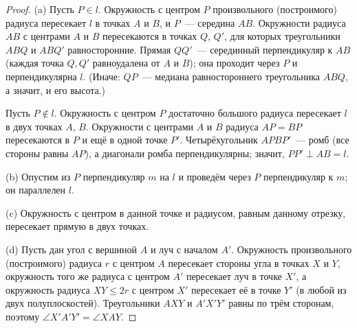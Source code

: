 \begin{proof}
(a) Пусть $P\in l$. Окружность с центром $P$ произвольного (построимого) радиуса пересекает $l$ в точках $A$ и $B$, и
$P$~--- середина $AB$. Окружности радиуса $AB$ с центрами $A$ и $B$ пересекаются в точках $Q$, $Q'$, для которых
треугольники $ABQ$ и $ABQ'$ равносторонние. Прямая $QQ'$~--- серединный перпендикуляр к $AB$ (каждая точка $Q,Q'$
равноудалена от $A$ и $B$); она проходит через $P$ и перпендикулярна $l$. (Иначе: $QP$~--- медиана равностороннего
треугольника $ABQ$, а значит, и его высота.)

Пусть $P\notin l$. Окружность с центром $P$ достаточно большого радиуса пересекает $l$ в двух точках $A$, $B$. Окружности с
центрами $A$ и $B$ радиуса $AP=BP$ пересекаются в $P$ и ещё в одной точке $P'$. Четырёхугольник $APBP'$~--- ромб (все
стороны равны $AP$), а диагонали ромба перпендикулярны; значит, $PP'\perp AB=l$.

(b) Опустим из $P$ перпендикуляр $m$ на $l$ и проведём через $P$ перпендикуляр к $m$; он параллелен $l$.

(c) Окружность с центром в данной точке и радиусом, равным данному отрезку, пересекает прямую в двух точках.

(d) Пусть дан угол с вершиной $A$ и луч с началом $A'$. Окружность произвольного (построимого) радиуса $r$ с центром $A$
пересекает стороны угла в точках $X$ и $Y$, окружность того же радиуса с центром $A'$ пересекает луч в точке $X'$, а
окружность радиуса $XY\le2r$ с центром $X'$ пересекает её в точке $Y'$ (в любой из двух полуплоскостей). Треугольники
$AXY$ и $A'X'Y'$ равны по трём сторонам, поэтому $\angle X'A'Y'=\angle XAY$.
\end{proof}

